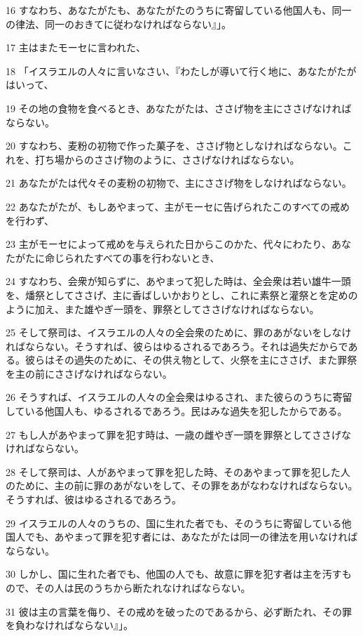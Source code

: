 \par 16 すなわち、あなたがたも、あなたがたのうちに寄留している他国人も、同一の律法、同一のおきてに従わなければならない』」。
\par 17 主はまたモーセに言われた、
\par 18 「イスラエルの人々に言いなさい、『わたしが導いて行く地に、あなたがたがはいって、
\par 19 その地の食物を食べるとき、あなたがたは、ささげ物を主にささげなければならない。
\par 20 すなわち、麦粉の初物で作った菓子を、ささげ物としなければならない。これを、打ち場からのささげ物のように、ささげなければならない。
\par 21 あなたがたは代々その麦粉の初物で、主にささげ物をしなければならない。
\par 22 あなたがたが、もしあやまって、主がモーセに告げられたこのすべての戒めを行わず、
\par 23 主がモーセによって戒めを与えられた日からこのかた、代々にわたり、あなたがたに命じられたすべての事を行わないとき、
\par 24 すなわち、会衆が知らずに、あやまって犯した時は、全会衆は若い雄牛一頭を、燔祭としてささげ、主に香ばしいかおりとし、これに素祭と灌祭とを定めのように加え、また雄やぎ一頭を、罪祭としてささげなければならない。
\par 25 そして祭司は、イスラエルの人々の全会衆のために、罪のあがないをしなければならない。そうすれば、彼らはゆるされるであろう。それは過失だからである。彼らはその過失のために、その供え物として、火祭を主にささげ、また罪祭を主の前にささげなければならない。
\par 26 そうすれば、イスラエルの人々の全会衆はゆるされ、また彼らのうちに寄留している他国人も、ゆるされるであろう。民はみな過失を犯したからである。
\par 27 もし人があやまって罪を犯す時は、一歳の雌やぎ一頭を罪祭としてささげなければならない。
\par 28 そして祭司は、人があやまって罪を犯した時、そのあやまって罪を犯した人のために、主の前に罪のあがないをして、その罪をあがなわなければならない。そうすれば、彼はゆるされるであろう。
\par 29 イスラエルの人々のうちの、国に生れた者でも、そのうちに寄留している他国人でも、あやまって罪を犯す者には、あなたがたは同一の律法を用いなければならない。
\par 30 しかし、国に生れた者でも、他国の人でも、故意に罪を犯す者は主を汚すもので、その人は民のうちから断たれなければならない。
\par 31 彼は主の言葉を侮り、その戒めを破ったのであるから、必ず断たれ、その罪を負わなければならない』」。
